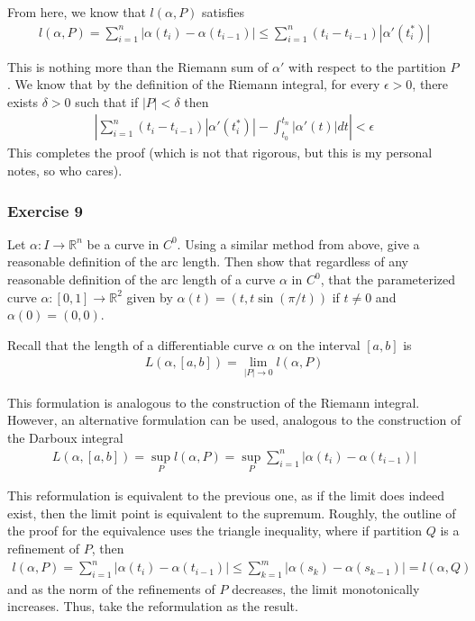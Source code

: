 \documentclass{article}
\newcommand{\R}{\mathbb{R}}
\begin{document}
	From here, we know that $l(\alpha, P)$ satisfies
	\begin{gather*}
		l(\alpha, P) = \sum_{i = 1}^n |\alpha(t_i) - \alpha(t_{i - 1})| \leq \sum_{i = 1}^n (t_i - t_{i - 1}) \left| \alpha'(t_i^*) \right|
	\end{gather*}
		
	This is nothing more than the Riemann sum of $\alpha'$ with respect to the partition $P$. We know that by the definition of the Riemann integral, for every $\epsilon > 0$, there exists $\delta > 0$ such that if $|P| < \delta$ then
	\begin{gather*}
		\left| \sum_{i = 1}^n (t_i - t_{i - 1}) \left| \alpha'(t_i^*) \right| - \int_{t_0}^{t_n} |\alpha'(t)| dt \right| < \epsilon
	\end{gather*}
	This completes the proof (which is not that rigorous, but this is my personal notes, so who cares).
	
	\subsubsection*{Exercise 9}
	Let $\alpha \colon I \to \R^n$ be a curve in $C^0$. Using a similar method from above, give a reasonable definition of the arc length. Then show that regardless of any reasonable definition of the arc length of a curve $\alpha$ in $C^0$, that the parameterized curve $\alpha: [0, 1] \to \R^2$ given by $\alpha(t) = (t, t \sin (\pi/t))$ if $t \neq 0$ and $\alpha(0) = (0, 0)$.
	
	Recall that the length of a differentiable curve $\alpha$ on the interval $[a, b]$ is
	\begin{gather*}
		L(\alpha, [a, b]) = \lim_{|P| \to 0} l(\alpha, P)
	\end{gather*}
	
	This formulation is analogous to the construction of the Riemann integral. However, an alternative formulation can be used, analogous to the construction of the Darboux integral
	\begin{gather*}
		L(\alpha, [a, b]) = \sup_{P} l(\alpha, P) = \sup_{P} \sum_{i = 1}^{n} \left| \alpha(t_i) - \alpha(t_{i - 1}) \right|
	\end{gather*}
	
	This reformulation is equivalent to the previous one, as if the limit does indeed exist, then the limit point is equivalent to the supremum. Roughly, the outline of the proof for the equivalence uses the triangle inequality, where if partition $Q$ is a refinement of $P$, then 
	\begin{gather*}
		l(\alpha, P) = \sum_{i = 1}^{n} |\alpha(t_i) - \alpha(t_{i - 1})| \leq  \sum_{k = 1}^{m} |\alpha(s_k) - \alpha(s_{k - 1})| = l(\alpha, Q)
	\end{gather*}
	and as the norm of the refinements of $P$ decreases, the limit monotonically increases. Thus, take the reformulation as the result.
	
\end{document}
